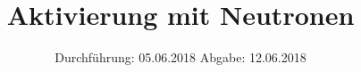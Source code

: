 

\subject{Versuch 702}
\title{Aktivierung mit Neutronen}
\date{%
  Durchführung: 05.06.2018
  \hspace{3em}
  Abgabe: 12.06.2018
}



\maketitle
\thispagestyle{empty}
\tableofcontents
\newpage






\printbibliography{}


